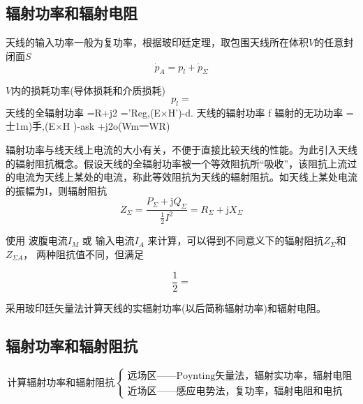     \subsection{辐射功率和辐射电阻}
        天线的输入功率一般为复功率，根据玻印廷定理，取包围天线所在体积$V$的任意封闭面$S$
        \begin{equation}
            \dot{p}_A=p_l+\dot{p}_\Sigma
        \end{equation}

        $V$内的损耗功率(导体损耗和介质损耗)
        \begin{equation}
            p_l=
        \end{equation}
        天线的全辐射功率
        =R+j2
        ='Reg,(E×H')-d.
        天线的辐射功率
        f
        辐射的无功功率
        =士1m)手,(E×H )-ask
        +j2o(Wm一WR)


        辐射功率与线天线上电流的大小有关，不便于直接比较天线的性能。为此引入天线的辐射阻抗概念。假设天线的全辐射功率被一个等效阻抗所“吸收”，该阻抗上流过的电流为天线上某处的电流，称此等效阻抗为天线的辐射阻抗。如天线上某处电流的振幅为I，则辐射阻抗
        \begin{equation}
            Z_\Sigma=\frac{P_\Sigma+\mathrm{j}Q_\Sigma}{\frac{1}{2}I^2}=R_\Sigma+\mathrm{j}X_\Sigma
        \end{equation}

        使用 波腹电流$I_M$ 或 输入电流$I_A$ 来计算，可以得到不同意义下的辐射阻抗$Z_\Sigma$和$Z_{\Sigma A}$，
        两种阻抗值不同，但满足
        
        \begin{equation}
            \frac{1}{2}=
        \end{equation}

        采用玻印廷矢量法计算天线的实辐射功率(以后简称辐射功率)和辐射电阻。

    \subsection{辐射功率和辐射阻抗}

        \begin{equation*}
        \mbox{计算辐射功率和辐射阻抗}
        \begin{cases}
            \mbox{远场区——Poynting矢量法，辐射实功率，辐射电阻}\\
            \mbox{近场区——感应电势法，复功率，辐射电阻和电抗}
        \end{cases}
        \end{equation*}

